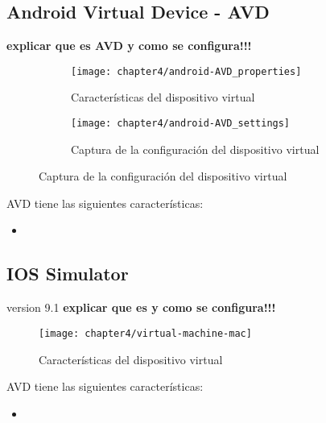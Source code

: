 \subsection*{Android Virtual Device - AVD}
\textbf{explicar que es AVD y como se configura!!!}
\begin{figure}[!pb]
	\begin{subfigure}{.55\textwidth}
		    \centering
			\texttt{[image: chapter4/android-AVD\_properties]}
			\caption{Características del dispositivo virtual}
		    	\label{fig:chapter04:androidAVDproperties}
	\end{subfigure}
	\begin{subfigure}{.55\textwidth}
		    \centering
			\texttt{[image: chapter4/android-AVD\_settings]}
			\caption{Captura de la configuración del dispositivo virtual}
		    	\label{fig:chapter04:androidAVDsettings}
	\end{subfigure}
\end{figure}
AVD tiene las siguientes características:
\begin{itemize}
	\item 
\end{itemize}
\subsection*{IOS Simulator}
version 9.1
\textbf{explicar que es y como se configura!!!}
\begin{figure}[!pb]
		    \centering
			\texttt{[image: chapter4/virtual-machine-mac]}
			\caption{Características del dispositivo virtual}
		    	\label{fig:chapter04:VMwareVirtualMachine}
\end{figure}
AVD tiene las siguientes características:
\begin{itemize}
	\item 
\end{itemize}